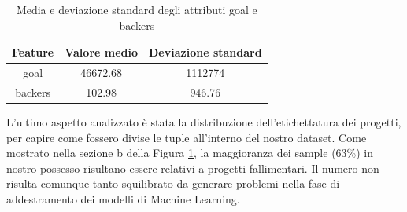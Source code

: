 \begin{table}
	\centering
	\caption{Media e deviazione standard degli attributi goal e backers}
	\begin{tabular}{|c|c|c|}
		\hline 
		\textbf{Feature} & \textbf{Valore medio} & \textbf{Deviazione standard} \\ 
		\hline 
		goal & 46672.68 & 1112774 \\ 
		\hline 
		backers & 102.98 & 946.76 \\ 
		\hline 
	\end{tabular} 
	\label{tab:backer}
\end{table}


L'ultimo aspetto analizzato è stata la distribuzione dell'etichettatura dei progetti, per capire come fossero divise le tuple all'interno del nostro dataset. Come mostrato nella sezione b della Figura \ref{fig:piestate}, la maggioranza dei sample (63\%) in nostro possesso risultano essere relativi a progetti fallimentari. Il numero non risulta comunque tanto squilibrato da generare problemi nella fase di addestramento dei modelli di Machine Learning.

\begin{figure}%
	\centering
	\qquad
	\caption{}%
	\label{fig:piestate}%
\end{figure}

